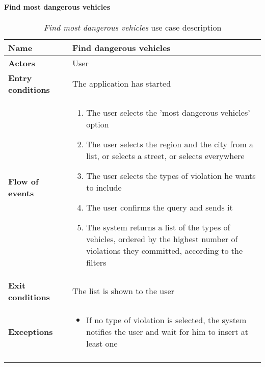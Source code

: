 		\paragraph{Find most dangerous vehicles}
		\begin{longtable}{p{0.25\linewidth}p{0.75\linewidth}}
			\toprule
			\textbf{Name} & \textbf{Find dangerous vehicles} \\
			\midrule
			\textbf{Actors} & User \\
			\midrule
			\textbf{Entry conditions} & The application has started \\
			\midrule
			\textbf{Flow of events} & 
			\begin{enumerate}
				\item The user selects the 'most dangerous vehicles' option
				\item The user selects the region and the city from a list, or selects a street, or selects everywhere
				\item The user selects the types of violation he wants to include
				\item The user confirms the query and sends it
				\item The system returns a list of the types of vehicles, ordered by the highest number of violations they committed, according to the filters
			\end{enumerate} \\
			\midrule
			\textbf{Exit conditions} & The list is shown to the user\\
			\midrule
			\textbf{Exceptions} & 
			\begin{itemize}
				\item 	If no type of violation is selected, the system notifies the user and wait for him to insert at least one	
			\end{itemize} \\
			\bottomrule
			\caption{\emph{Find most dangerous vehicles} use case description}
		\end{longtable}
		
